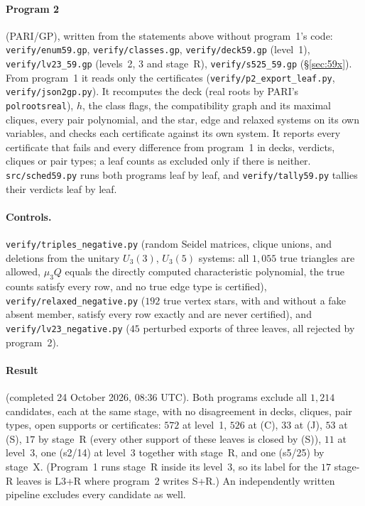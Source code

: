 \documentclass[11pt]{article}
\theoremstyle{definition}
\begin{document}
\paragraph{Program 2} (PARI/GP), written from the statements above without program~1's code:
\texttt{verify/enum59.gp}, \texttt{verify/classes.gp}, \texttt{verify/deck59.gp} (level~1),
\texttt{verify/lv23\_59.gp} (levels~2, 3 and stage~R), \texttt{verify/s525\_59.gp}
(\S\ref{sec:59x}). From program~1 it reads only the
certificates (\texttt{verify/p2\_export\_leaf.py}, \texttt{verify/json2gp.py}). It recomputes the deck
(real roots by PARI's \texttt{polrootsreal}), $h$,
the class flags, the compatibility graph and its maximal cliques, every pair polynomial, and the star,
edge and relaxed systems on its own variables, and checks each certificate against its own system.
It reports every certificate that fails and every difference from program~1 in decks, verdicts,
cliques or pair types; a leaf counts as excluded only if there is neither. \texttt{src/sched59.py}
runs both programs leaf by leaf, and \texttt{verify/tally59.py} tallies their verdicts leaf by leaf.

\paragraph{Controls.} \texttt{verify/triples\_negative.py} (random Seidel matrices, clique unions,
and deletions from the unitary $U_3(3)$, $U_3(5)$ systems: all $1{,}055$ true triangles are allowed,
$\mu_3Q$ equals the directly computed characteristic polynomial, the true counts satisfy every row,
and no true edge type is certified), \texttt{verify/relaxed\_negative.py} ($192$ true vertex stars,
with and without a fake absent member, satisfy every row exactly and are never certified), and
\texttt{verify/lv23\_negative.py} ($45$ perturbed exports of three leaves, all rejected by
program~2).

\paragraph{Result} (completed 24 October 2026, 08:36 UTC). Both programs exclude all $1{,}214$
candidates, each at the same stage, with no disagreement in decks, cliques, pair types, open
supports or certificates: $572$ at level~1, $526$ at (C), $33$ at (J), $53$ at (S), $17$ by stage~R (every other support of these leaves is closed by (S)), $11$ at level~3, one (s2/14) at level~3 together with stage~R, and one (s5/25) by stage~X. (Program~1 runs stage~R inside its level~3, so its label for the $17$ stage-R leaves is L3+R where program~2 writes S+R.) An independently written pipeline excludes every
candidate as well.
\end{document}
